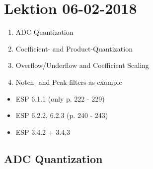 \section{Lektion 06-02-2018}

\begin{enumerate}
	\item ADC Quantization
	\item Coefficient- and Product-Quantization
	\item Overflow/Underflow and Coefficient Scaling
	\item Notch- and Peak-filters as example
\end{enumerate}

\begin{mdframed}[style=exampledefault]
\begin{itemize}
	\item ESP 6.1.1 (only p. 222 - 229)
	\item ESP 6.2.2, 6.2.3 (p. 240 - 243)
	\item ESP 3.4.2 + 3.4,3
\end{itemize}
\end{mdframed}

\subsection{ADC Quantization}

